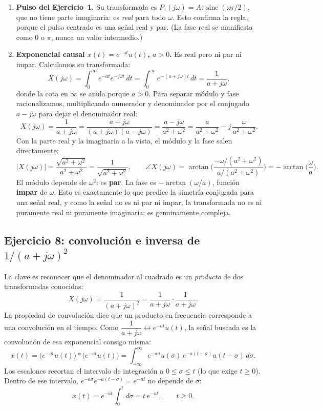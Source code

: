 \documentclass[10pt,a4paper]{article}
\begin{document}
	\begin{enumerate}[label=\textbf{\alph*)}]
		\item \textbf{Pulso del Ejercicio~1.} Su transformada es $P_\tau(j\omega)=A\tau\operatorname{sinc}(\omega\tau/2)$, que no tiene parte imaginaria: es \emph{real} para todo $\omega$. Esto confirma la regla, porque el pulso centrado es una señal real y par. (La fase real se manifiesta como $0$ o $\pi$, nunca un valor intermedio.)

		\item \textbf{Exponencial causal $x(t)=e^{-at}u(t)$, $a>0$.} Es real pero ni par ni impar. Calculamos su transformada:
		\[
			X(j\omega)=\int_0^\infty e^{-at}e^{-j\omega t}\,dt = \int_0^\infty e^{-(a+j\omega)t}\,dt = \frac{1}{a+j\omega},
		\]
		donde la cota en $\infty$ se anula porque $a>0$. Para separar módulo y fase racionalizamos, multiplicando numerador y denominador por el conjugado $a-j\omega$ para dejar el denominador real:
		\[
			X(j\omega)=\frac{1}{a+j\omega}=\frac{a-j\omega}{(a+j\omega)(a-j\omega)}=\frac{a-j\omega}{a^2+\omega^2}=\frac{a}{a^2+\omega^2}-j\,\frac{\omega}{a^2+\omega^2}.
		\]
		Con la parte real y la imaginaria a la vista, el módulo y la fase salen directamente:
		\[
			|X(j\omega)| = \frac{\sqrt{a^2+\omega^2}}{a^2+\omega^2}=\frac{1}{\sqrt{a^2+\omega^2}}, \qquad \angle X(j\omega) = \arctan\!\Big(\frac{-\omega/(a^2+\omega^2)}{a/(a^2+\omega^2)}\Big)=-\arctan\!\Big(\frac{\omega}{a}\Big).
		\]
		El módulo depende de $\omega^2$: es \textbf{par}. La fase es $-\arctan(\omega/a)$, función \textbf{impar} de $\omega$. Esto es exactamente lo que predice la simetría conjugada para una señal real, y como la señal no es ni par ni impar, la transformada no es ni puramente real ni puramente imaginaria: es genuinamente compleja.
	\end{enumerate}

	\subsection*{Ejercicio 8: convolución e inversa de $1/(a+j\omega)^2$}

	La clave es reconocer que el denominador al cuadrado es un \emph{producto} de dos transformadas conocidas:
	\[
		X(j\omega) = \frac{1}{(a+j\omega)^2} = \frac{1}{a+j\omega}\cdot\frac{1}{a+j\omega}.
	\]
	La propiedad de convolución dice que un producto en frecuencia corresponde a una convolución en el tiempo. Como $\dfrac{1}{a+j\omega}\leftrightarrow e^{-at}u(t)$, la señal buscada es la convolución de esa exponencial consigo misma:
	\[
		x(t) = \big(e^{-at}u(t)\big) * \big(e^{-at}u(t)\big) = \int_{-\infty}^{\infty} e^{-a\sigma}u(\sigma)\,e^{-a(t-\sigma)}u(t-\sigma)\,d\sigma.
	\]
	Los escalones recortan el intervalo de integración a $0\le\sigma\le t$ (lo que exige $t\ge0$). Dentro de ese intervalo, $e^{-a\sigma}e^{-a(t-\sigma)}=e^{-at}$ no depende de $\sigma$:
	\[
		x(t) = e^{-at}\int_0^t d\sigma = t\,e^{-at}, \qquad t\ge0.
	\]
\end{document}
